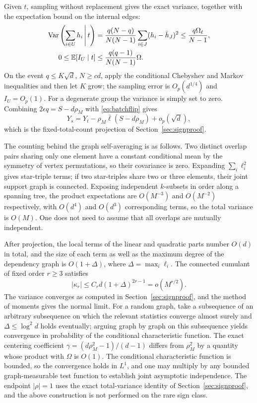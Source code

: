 Given $t$, sampling without replacement gives the exact variance, together with the expectation bound on the
internal edges:
\begin{align*}
\operatorname{Var}\left(\sum_{i\in U}h_i\,\middle|\, t\right)
&=\frac{q(N-q)}{N(N-1)}\sum_{i\in J}(h_i-\bar h_J)^2
\le\frac{q\Omega_\ell}{N-1},\\
0\le\mathbb E[I_U\mid t]&\le\frac{q(q-1)}{N(N-1)}\Omega.
\end{align*}
On the event $q\le K\sqrt d$, $N\ge cd$, apply the conditional Chebyshev and Markov inequalities and then let
$K$ grow; the sampling error is $O_p(d^{1/4})$ and $I_U=O_p(1)$. For a degenerate group the variance is
simply set to zero. Combining $2\epsilon q=S-d\rho_M$ with \eqref{eq:batchflip} gives
\[
Y_s=Y_t-\rho_M\bar\ell(S-d\rho_M)+o_p(\sqrt d),
\]
which is the fixed-total-count projection of Section~\ref{sec:signproof}.

The counting behind the graph self-averaging is as follows. Two distinct overlap pairs sharing only one
element have a constant conditional mean by the symmetry of vertex permutations, so their covariance is zero.
Expanding $\sum_i \ell_i^2$ gives star-triple terms; if two star-triples share two or three elements, their
joint support graph is connected. Exposing independent $k$-subsets in order along a spanning tree, the
product expectations are $O(M^{-3})$ and $O(M^{-2})$ respectively, with $O(d^4)$ and $O(d^3)$ corresponding
terms, so the total variance is $O(M)$. One does not need to assume that all overlaps are mutually
independent.

After projection, the local terms of the linear and quadratic parts number $O(d)$ in total, and the size of
each term as well as the maximum degree of the dependency graph is $O(1+\Delta)$, where
$\Delta=\max_i \ell_i$. The connected cumulant of fixed order $r\ge3$ satisfies
\[
|\kappa_r|\le C_r d(1+\Delta)^{2r-1}=o(M^{r/2}).
\]
The variance converges as computed in Section~\ref{sec:signproof}, and the method of moments gives the normal
limit. For a random graph, take a subsequence of an arbitrary subsequence on which the relevant statistics
converge almost surely and $\Delta\le\log^2d$ holds eventually; arguing graph by graph on this subsequence
yields convergence in probability of the conditional characteristic function. The exact centering coefficient
$\gamma=(d\rho_M^2-1)/(d-1)$ differs from $\rho_M^2$ by a quantity whose product with $\Omega$ is $O(1)$.
The conditional characteristic function is bounded, so the convergence holds in $L^1$, and one may multiply by
any bounded graph-measurable test function to establish joint asymptotic independence. The endpoint
$|\rho|=1$ uses the exact total-variance identity of Section~\ref{sec:signproof}, and the above construction
is not performed on the rare sign class.

